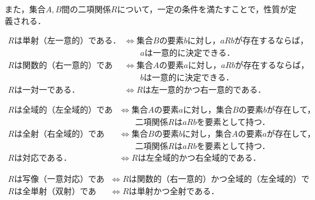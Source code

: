 また，集合$A, B$間の二項関係$R$について，一定の条件を満たすことで，性質が定義される．
\begin{definition}[一意性]
	\label{def:uniqueness}
	\begin{align*}
	\text{$R$は単射（左一意的）である．} &\Leftrightarrow \text{集合$B$の要素$b$に対し，$aRb$が存在するならば，} \\
	&\qquad \text{$a$は一意的に決定できる．} \\
	\text{$R$は関数的（右一意的）である．} &\Leftrightarrow \text{集合$A$の要素$a$に対し，$aRb$が存在するならば，} \\
	&\qquad \text{$b$は一意的に決定できる．} \\
	\text{$R$は一対一である．} &\Leftrightarrow \text{$R$は左一意的かつ右一意的である．}
	\end{align*}
\end{definition}
\begin{definition}[全域性]
	\label{def:total}
	\begin{align*}
	\text{$R$は全域的（左全域的）である．} &\Leftrightarrow \text{集合$A$の要素$a$に対し，集合$B$の要素$b$が存在して，} \\
	&\qquad \text{二項関係$R$は$aRb$を要素として持つ．} \\
	\text{$R$は全射（右全域的）である．} &\Leftrightarrow \text{集合$B$の要素$b$に対し，集合$A$の要素$a$が存在して，} \\
	&\qquad \text{二項関係$R$は$aRb$を要素として持つ．} \\
	\text{$R$は対応である．} &\Leftrightarrow \text{$R$は左全域的かつ右全域的である．}
	\end{align*}
\end{definition}
\begin{definition}[写像および全単射]
	\label{def:specialRelations}
	\begin{align*}
	\text{$R$は写像（一意対応）である．} &\Leftrightarrow \text{$R$は関数的（右一意的）かつ全域的（左全域的）である．} \\
	\text{$R$は全単射（双射）である．} &\Leftrightarrow \text{$R$は単射かつ全射である．}
	\end{align*}
\end{definition}
